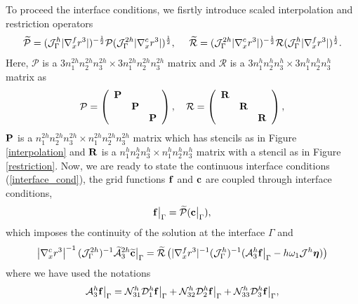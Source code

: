 To proceed the interface conditions, we fisrtly introduce scaled interpolation and restriction operators
\[\widetilde{\mathcal{P}} = (\mathcal{J}^h_\Gamma |\nabla_x^f r^3|)^{-\frac{1}{2}}\mathcal{P}(\mathcal{J}^{2h}_\Gamma |\nabla_x^c r^3|)^{\frac{1}{2}},\ \ \ \ \widetilde{\mathcal{R}} =  (\mathcal{J}^{2h}_\Gamma |\nabla_x^c r^3|)^{-\frac{1}{2}}\mathcal{R}(\mathcal{J}^{h}_\Gamma |\nabla_x^f r^3|)^{\frac{1}{2}}.\]
Here, $\mathcal{P}$ is a $3n_1^{2h}n_2^{2h}n_3^{2h}\times 3n_1^{2h}n_2^{2h}n_3^{2h}$ matrix and $\mathcal{R}$ is a $3n_1^hn_2^hn_3^h\times 3n_1^hn_2^hn_3^h$ matrix as 
\begin{align}\label{iandr}
\mathcal{P} = \left(\begin{array}{ccc}
{\bf P}& ~  & ~ \\
~ & {\bf P} & ~ \\
~ &~  &{\bf P}\end{array}\right),\ \ \ \mathcal{R} = \left(\begin{array}{ccc}
{\bf R}& ~  & ~ \\
~ & {\bf R} & ~ \\
~ &~  &{\bf R}\end{array}\right),
\end{align}
$\bf P$ is a $n_1^{2h}n_2^{2h}n_3^{2h}\times n_1^{2h}n_2^{2h}n_3^{2h}$ matrix which has stencils as in Figure \ref{interpolation} and $\bf R$ is a $n_1^hn_2^hn_3^h\times n_1^hn_2^hn_3^h$ matrix with a stencil as in Figure \ref{restriction}. Now, we are ready to state the continuous interface conditions (\ref{interface_cond}), the grid functions ${\bf f}$ and ${\bf c}$ are coupled through interface conditions,
\begin{equation}\label{continuous_sol}
{\bf f}\big|_{\Gamma} = \wt{\mathcal{P}}({\bf c}\big|_{\Gamma}),
\end{equation}
which imposes the continuity of the solution at the interface $\Gamma$
and
\begin{equation}\label{continuous_traction}
\left|\nabla_x^c r^{3}\right|^{-1}({\mathcal J}_{\Gamma}^{2h})^{-1}\wt{\mathcal{A}}_3^{2h}\wt{\bf c}\big|_\Gamma
= \wt{\mathcal{R}}\left(|\nabla_x^f r^{3}|^{-1}({\mathcal J}^h_{\Gamma})^{-1}(\mathcal{A}_3^h{\bf f}\big|_\Gamma-h\omega_1{\mathcal J}^h{\bm \eta})\right)
\end{equation}
where we have used the notations
\begin{equation}\label{hatAf}
\mathcal{A}_3^h{\bf f}\big|_\Gamma = \mathcal{N}_{31}^{h}\mathcal{D}^h_1{\bf f}\big|_\Gamma + \mathcal{N}_{32}^h\mathcal{D}^h_2{\bf f}\big|_\Gamma + \mathcal{N}_{33}^h\mathcal{D}_3^h{\bf f}\big|_\Gamma,
\end{equation}
